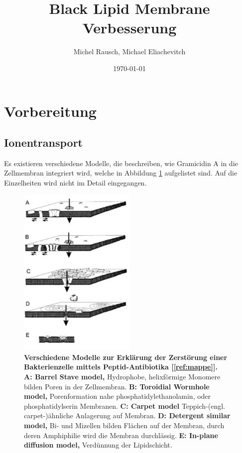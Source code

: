 \documentclass[a4paper,ngerman]{scrartcl}
\title{Black Lipid Membrane\\ Verbesserung}
\date{\today}
\author{Michel Rausch, Michael Eliachevitch}
\begin{document}
\maketitle
\tableofcontents
\newpage

\section{Vorbereitung}

\subsection{Ionentransport}

Es existieren verschiedene Modelle, die beschreiben, wie Gramicidin A in die Zellmembran integriert wird, welche in Abbildung \ref{fig:wirkmechanismus} aufgelistet sind. Auf die Einzelheiten wird nicht im Detail eingegangen.



\begin{figure}
\includegraphics[width=0.5\textwidth]{abbildungen/wirkmechanismus.png}
\caption{\textbf{Verschiedene Modelle zur Erklärung der Zerstörung einer Bakterienzelle mittels Peptid-Antibiotika [\ref{ref:mappe}].}\\
\textbf{A: Barrel Stave model,} 
Hydrophobe, helixförmige Monomere bilden Poren in der Zellmembran.
\textbf{B: Toroidial Wormhole model,}  
Porenformation nahe phosphatidylethanolamin, oder phosphatidylserin Membranen. 
\textbf{C: Carpet model}  
Teppich-(engl. carpet-)ähnliche Anlagerung auf Membran.
\textbf{D:  Detergent similar model,}
Bi- und Mizellen bilden Flächen auf der Membran, durch deren Amphiphilie wird die Membran durchlässig.
\textbf{E:  In-plane diffusion model,}
Verdünnung der Lipidschicht.
}
\label{fig:wirkmechanismus}
\end{figure}
\end{document}
